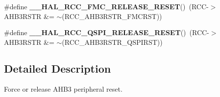 \begin{DoxyCompactItemize}
\item 
\#define {\bfseries \+\_\+\+\_\+\+H\+A\+L\+\_\+\+R\+C\+C\+\_\+\+F\+M\+C\+\_\+\+R\+E\+L\+E\+A\+S\+E\+\_\+\+R\+E\+S\+ET}()~(R\+CC-\/$>$A\+H\+B3\+R\+S\+TR \&= $\sim$(R\+C\+C\+\_\+\+A\+H\+B3\+R\+S\+T\+R\+\_\+\+F\+M\+C\+R\+ST))\hypertarget{group___r_c_c_ex___a_h_b3___force___release___reset_ga191d8277915b05918cc1d9a79269f025}{}\label{group___r_c_c_ex___a_h_b3___force___release___reset_ga191d8277915b05918cc1d9a79269f025}

\item 
\#define {\bfseries \+\_\+\+\_\+\+H\+A\+L\+\_\+\+R\+C\+C\+\_\+\+Q\+S\+P\+I\+\_\+\+R\+E\+L\+E\+A\+S\+E\+\_\+\+R\+E\+S\+ET}()~(R\+CC-\/$>$A\+H\+B3\+R\+S\+TR \&= $\sim$(R\+C\+C\+\_\+\+A\+H\+B3\+R\+S\+T\+R\+\_\+\+Q\+S\+P\+I\+R\+ST))\hypertarget{group___r_c_c_ex___a_h_b3___force___release___reset_gaba6a441e1c8f8ae009f51d7d9fa8233d}{}\label{group___r_c_c_ex___a_h_b3___force___release___reset_gaba6a441e1c8f8ae009f51d7d9fa8233d}

\end{DoxyCompactItemize}


\subsection{Detailed Description}
Force or release A\+H\+B3 peripheral reset. 

